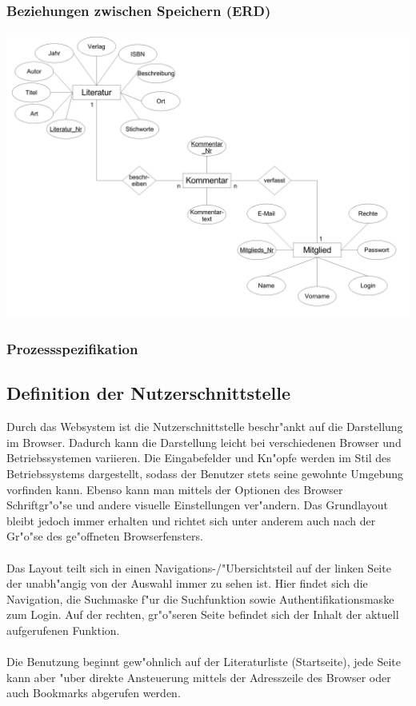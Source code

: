 \subsubsection{Beziehungen zwischen Speichern (ERD)}
\includegraphics[scale=0.36]{erd1}

\subsubsection{Prozessspezifikation}






\subsection{Definition der Nutzerschnittstelle}

Durch das Websystem ist die Nutzerschnittstelle beschr"ankt auf die Darstellung im Browser. Dadurch kann die Darstellung
leicht bei verschiedenen Browser und Betriebssystemen variieren. Die Eingabefelder und Kn"opfe werden im Stil des 
Betriebssystems dargestellt, sodass der Benutzer stets seine gewohnte Umgebung vorfinden kann. Ebenso kann man mittels der Optionen
des Browser Schriftgr"o"se und andere visuelle Einstellungen ver"andern. Das Grundlayout bleibt jedoch immer erhalten
und richtet sich unter anderem auch nach der Gr"o"se des ge"offneten Browserfensters.\\
\\
Das Layout teilt sich in einen Navigations-/"Ubersichtsteil auf der linken Seite der unabh"angig von der Auswahl immer
zu sehen ist. Hier findet sich die Navigation, die Suchmaske f"ur die Suchfunktion sowie Authentifikationsmaske zum Login.
Auf der rechten, gr"o"seren Seite befindet sich der Inhalt der aktuell aufgerufenen Funktion.\\
\\
Die Benutzung beginnt gew"ohnlich auf der Literaturliste (Startseite), jede Seite kann aber "uber direkte
Ansteuerung mittels der Adresszeile des Browser oder auch Bookmarks abgerufen werden.\\

